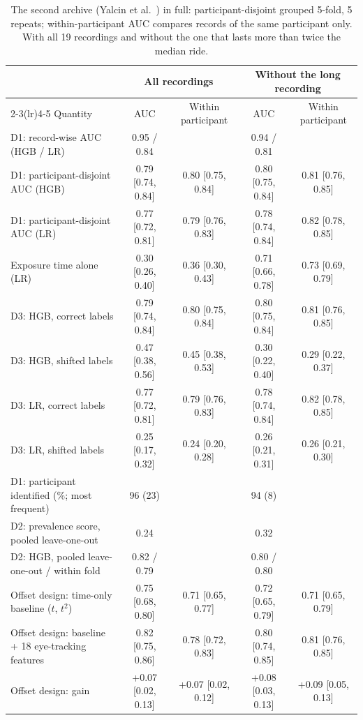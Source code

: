 \begin{table}[ht]
\centering
\footnotesize
\caption{The second archive (Yalcin et al.\ \cite{yalcin2024}) in full: participant-disjoint grouped 5-fold, 5 repeats; within-participant AUC compares records of the same participant only. With all 19 recordings and without the one that lasts more than twice the median ride.}
\label{tab:supp_second}
\setlength{\tabcolsep}{3pt}
\begin{tabular}{@{}lcccc@{}}
\toprule
 & \multicolumn{2}{c}{All recordings} & \multicolumn{2}{c}{Without the long recording} \\
\cmidrule(lr){2-3}\cmidrule(lr){4-5}
Quantity & AUC & Within participant & AUC & Within participant \\
\midrule
D1: record-wise AUC (HGB / LR) & 0.95 / 0.84 &  & 0.94 / 0.81 &  \\
D1: participant-disjoint AUC (HGB) & 0.79 [0.74, 0.84] & 0.80 [0.75, 0.84] & 0.80 [0.75, 0.84] & 0.81 [0.76, 0.85] \\
D1: participant-disjoint AUC (LR) & 0.77 [0.72, 0.81] & 0.79 [0.76, 0.83] & 0.78 [0.74, 0.84] & 0.82 [0.78, 0.85] \\
Exposure time alone (LR) & 0.30 [0.26, 0.40] & 0.36 [0.30, 0.43] & 0.71 [0.66, 0.78] & 0.73 [0.69, 0.79] \\
D3: HGB, correct labels & 0.79 [0.74, 0.84] & 0.80 [0.75, 0.84] & 0.80 [0.75, 0.84] & 0.81 [0.76, 0.85] \\
D3: HGB, shifted labels & 0.47 [0.38, 0.56] & 0.45 [0.38, 0.53] & 0.30 [0.22, 0.40] & 0.29 [0.22, 0.37] \\
D3: LR, correct labels & 0.77 [0.72, 0.81] & 0.79 [0.76, 0.83] & 0.78 [0.74, 0.84] & 0.82 [0.78, 0.85] \\
D3: LR, shifted labels & 0.25 [0.17, 0.32] & 0.24 [0.20, 0.28] & 0.26 [0.21, 0.31] & 0.26 [0.21, 0.30] \\
D1: participant identified (\%; most frequent) & 96 (23) & & 94 (8) & \\
D2: prevalence score, pooled leave-one-out & 0.24 & & 0.32 & \\
D2: HGB, pooled leave-one-out / within fold & 0.82 / 0.79 & & 0.80 / 0.80 & \\
Offset design: time-only baseline ($t$, $t^2$) & 0.75 [0.68, 0.80] & 0.71 [0.65, 0.77] & 0.72 [0.65, 0.79] & 0.71 [0.65, 0.79] \\
Offset design: baseline + 18 eye-tracking features & 0.82 [0.75, 0.86] & 0.78 [0.72, 0.83] & 0.80 [0.74, 0.85] & 0.81 [0.76, 0.85] \\
Offset design: gain & +0.07 [0.02, 0.13] & +0.07 [0.02, 0.12] & +0.08 [0.03, 0.13] & +0.09 [0.05, 0.13] \\
\bottomrule
\end{tabular}
\end{table}
